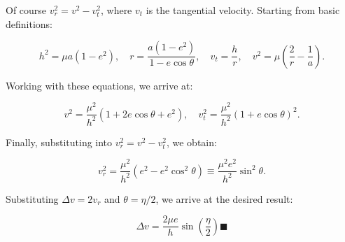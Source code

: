 \documentclass[11pt]{article}
\begin{document}
\begin{pproblem}
\begin{pssolution*}{}{}
        Of course \(v_r^2 = v^2 - v_t^2\), where \(v_t\) is the tangential velocity. Starting from basic definitions:

        \[
        h^2 = \mu a (1 - e^2), \quad r = \frac{a(1 - e^2)}{1 - e\cos\theta}, \quad v_t = \frac{h}{r}, \quad v^2 = \mu \left(\frac{2}{r} - \frac{1}{a}\right).
        \]

        Working with these equations, we arrive at:

        \[
        v^2 = \frac{\mu^2}{h^2}(1 + 2e\cos\theta + e^2), \quad v_t^2 = \frac{\mu^2}{h^2}(1 + e\cos\theta)^2.
        \]

        Finally, substituting into \(v_r^2 = v^2 - v_t^2\), we obtain:

        \[
        v_r^2 = \frac{\mu^2}{h^2}(e^2 - e^2\cos^2\theta) \equiv \frac{\mu^2e^2}{h^2}\sin^2\theta.
        \]

        Substituting \(\Delta v = 2v_r\) and \(\theta = \eta/2\), we arrive at the desired result:

        \[
        \boxed{\Delta v = \frac{2\mu e}{h}\sin\left(\frac{\eta}{2}\right) \blacksquare}
        \]
    \end{pssolution*}
\end{pproblem}
\end{document}
